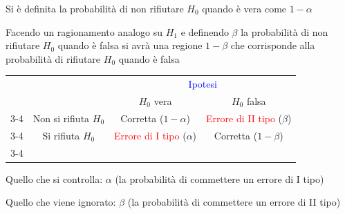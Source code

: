 \documentclass[
  ignorenonframetext,
  compress, aspectratio=149]{beamer}
\begin{document}
\begin{frame}{}
\label{section-25}
\small

Si è definita la probabilità di non rifiutare \(H_0\) quando è vera come
\(1-\alpha\)

Facendo un ragionamento analogo su \(H_1\) e definendo \(\beta\) la
probabilità di non rifiutare \(H_0\) quando è falsa si avrà una regione
\(1- \beta\) che corrisponde alla probabilità di rifiutare \(H_0\)
quando è falsa

\begin{center}
\renewcommand{\arraystretch}{1.2}
\begin{tabular}{c c |c| c|}
  & \multicolumn{1}{c}{} & \multicolumn{2}{c}{\textcolor{blue}{Ipotesi}} \\
  & \multicolumn{1}{c}{} & \multicolumn{1}{c}{$H_0$ vera} & \multicolumn{1}{c}{$H_0$ falsa} \\
  \cline{3-4}
  \multirow{2}{*}{\textcolor{blue}{Decisione}} & Non si rifiuta $H_0$ & \textcolor{green!10!black!80}{Corretta} ($1-\alpha$) & \textcolor{red}{Errore di II tipo} ($\beta$) \\
  \cline{3-4}
  & Si rifiuta $H_0$ & \textcolor{red}{Errore di I tipo} ($\alpha$) & \textcolor{green!10!black!80}{Corretta} ($1-\beta$) \\
  \cline{3-4}
\end{tabular}
\end{center}

\vspace{3mm}

Quello che si controlla: \(\alpha\) (la probabilità di commettere un
errore di I tipo)

Quello che viene ignorato: \(\beta\) (la probabilità di commettere un
errore di II tipo)
\end{frame}
\end{document}
